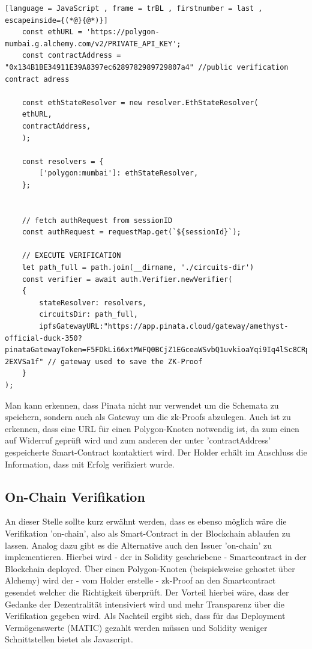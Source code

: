 \begin{lstlisting}[language = JavaScript , frame = trBL , firstnumber = last , escapeinside={(*@}{@*)}]
	const ethURL = 'https://polygon-mumbai.g.alchemy.com/v2/PRIVATE_API_KEY';
	const contractAddress = "0x134B1BE34911E39A8397ec6289782989729807a4" //public verification contract adress
	
	const ethStateResolver = new resolver.EthStateResolver(
	ethURL,
	contractAddress,
	);
	
	const resolvers = {
		['polygon:mumbai']: ethStateResolver,
	};
	
	
	// fetch authRequest from sessionID
	const authRequest = requestMap.get(`${sessionId}`);
	
	// EXECUTE VERIFICATION
	let path_full = path.join(__dirname, './circuits-dir')
	const verifier = await auth.Verifier.newVerifier(
	{
		stateResolver: resolvers,
		circuitsDir: path_full,
		ipfsGatewayURL:"https://app.pinata.cloud/gateway/amethyst-official-duck-350?pinataGatewayToken=F5FDkLi66xtMWFQ0BCjZ1EGceaWSvbQ1uvkioaYqi9Iq4lSc8CRpMi-2EXVSa1f" // gateway used to save the ZK-Proof
	}
);
\end{lstlisting}
Man kann erkennen, dass Pinata nicht nur verwendet um die Schemata zu speichern, sondern auch als Gateway um die zk-Proofs abzulegen. Auch ist zu erkennen, dass eine URL für einen Polygon-Knoten notwendig ist, da zum einen auf Widerruf geprüft wird und zum anderen der unter 'contractAddress' gespeicherte Smart-Contract kontaktiert wird. Der Holder erhält im Anschluss die Information, dass mit Erfolg verifiziert wurde.

\subsection{On-Chain Verifikation}
An dieser Stelle sollte kurz erwähnt werden, dass es ebenso möglich wäre die Verifikation 'on-chain', also als Smart-Contract in der Blockchain ablaufen zu lassen. Analog dazu gibt es die Alternative auch den Issuer 'on-chain' zu implementieren. Hierbei wird - der in Solidity geschriebene - Smartcontract in der Blockchain deployed. Über einen Polygon-Knoten (beispielsweise gehostet über Alchemy) wird der - vom Holder erstelle - zk-Proof an den Smartcontract gesendet welcher die Richtigkeit überprüft. Der Vorteil hierbei wäre, dass der Gedanke der Dezentralität intensiviert wird und mehr Transparenz über die Verifikation gegeben wird. Als Nachteil ergibt sich, dass für das Deployment Vermögenswerte (MATIC) gezahlt werden müssen und Solidity weniger Schnittstellen bietet als Javascript.

